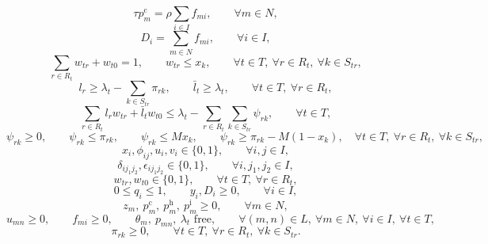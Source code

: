 \documentclass[11pt,a4paper]{article}
\begin{document}
\begin{equation}
\tau p_m^{\mathrm c} = \rho \sum_{i \in I} f_{mi},
\qquad \forall m \in N,
\tag{M23}
\end{equation}
\begin{equation}
D_i = \sum_{m \in N} f_{mi},
\qquad \forall i \in I,
\tag{M24}
\end{equation}
\begin{equation}
\sum_{r \in R_t} w_{tr} + w_{t0} = 1,
\qquad
w_{tr} \le x_k,
\qquad \forall t \in T,\ \forall r \in R_t,\ \forall k \in S_{tr},
\tag{M25}
\end{equation}
\begin{equation}
l_r \ge \lambda_t - \sum_{k \in S_{tr}} \pi_{rk},
\qquad
\bar{l}_t \ge \lambda_t,
\qquad \forall t \in T,\ \forall r \in R_t,
\tag{M26}
\end{equation}
\begin{equation}
\sum_{r \in R_t} l_r w_{tr} + \bar{l}_t w_{t0}
\le
\lambda_t - \sum_{r \in R_t} \sum_{k \in S_{tr}} \psi_{rk},
\qquad \forall t \in T,
\tag{M27}
\end{equation}
\begin{equation}
\psi_{rk} \ge 0,\qquad
\psi_{rk} \le \pi_{rk},\qquad
\psi_{rk} \le M x_k,\qquad
\psi_{rk} \ge \pi_{rk} - M(1-x_k),
\quad \forall t \in T,\ \forall r \in R_t,\ \forall k \in S_{tr},
\tag{M28}
\end{equation}
\begin{equation}
x_i,\phi_{ij},u_i,v_i \in \{0,1\},
\qquad \forall i,j \in I,
\tag{M29}
\end{equation}
\begin{equation}
 \delta_{ij_1 j_2},\epsilon_{ij_1 j_2} \in \{0,1\},
\qquad \forall i,j_1,j_2 \in I,
\tag{M30}
\end{equation}
\begin{equation}
w_{tr},w_{t0} \in \{0,1\},
\qquad \forall t \in T,\ \forall r \in R_t,
\tag{M31}
\end{equation}
\begin{equation}
0 \le q_i \le 1,
\qquad
y_i,D_i \ge 0,
\qquad \forall i \in I,
\tag{M32}
\end{equation}
\begin{equation}
z_m,\ p_m^{\mathrm c},\ p_m^{\mathrm h},\ p_m^{\mathrm i} \ge 0,
\qquad \forall m \in N,
\tag{M33}
\end{equation}
\begin{equation}
u_{mn} \ge 0,\qquad f_{mi} \ge 0,\qquad \theta_m,\ p_{mn},\ \lambda_t \text{ free},
\qquad \forall (m,n) \in L,\ \forall m \in N,\ \forall i \in I,\ \forall t \in T,
\tag{M34}
\end{equation}
\begin{equation}
\pi_{rk} \ge 0,
\qquad \forall t \in T,\ \forall r \in R_t,\ \forall k \in S_{tr}.
\tag{M35}
\end{equation}
\end{document}
